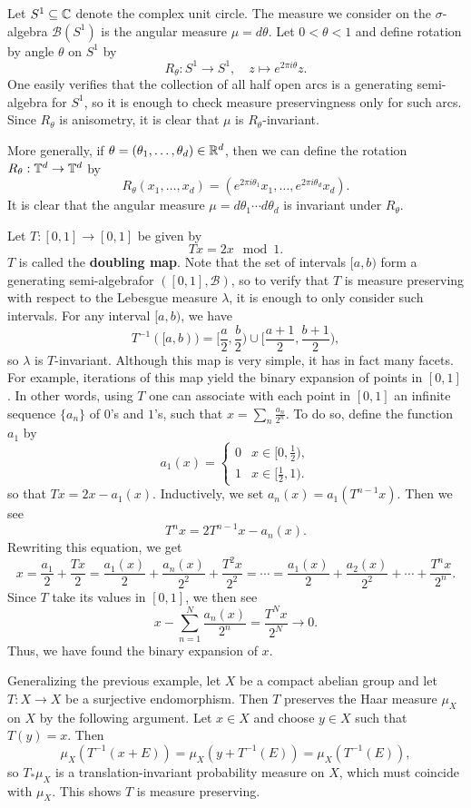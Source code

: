 \begin{example}
Let $S^1\subseteq\mathbb{C}$ denote the complex unit circle. The measure we consider on the $\sigma$-algebra $\mathcal{B}(S^1)$ is the angular measure $\mu=d\theta$. Let $0<\theta<1$ and define rotation by angle $\theta$ on $S^1$ by
\[R_\theta:S^1\to S^1,\quad z\mapsto e^{2\pi i\theta}z.\]
One easily verifies that the collection of all half open arcs is a generating semi-algebra for $S^1$, so it is enough to check measure preservingness only for such arcs. Since $R_\theta$ is anisometry, it is clear that $\mu$ is $R_\theta$-invariant.\par
More generally, if $\theta=(\theta_1,\dots,\theta_d)\in\mathbb{R}^d$, then we can define the rotation $R_\theta:\mathbb{T}^d\to\mathbb{T}^d$ by
\[R_\theta(x_1,\dots,x_d)=(e^{2\pi i\theta_1}x_1,\dots,e^{2\pi i\theta_d}x_d).\]
It is clear that the angular measure $\mu=d\theta_1\cdots d\theta_d$ is invariant under $R_\theta$.
\end{example}
\begin{example}
Let $T:[0,1]\to[0,1]$ be given by
\[Tx=2x\mod 1.\]
$T$ is called the \textbf{doubling map}. Note that the set of intervals $[a,b)$ form a generating semi-algebrafor $([0,1],\mathcal{B})$, so to verify that $T$ is measure preserving with respect to the Lebesgue measure $\lambda$, it is enough to only consider such intervals. For any interval $[a,b)$, we have
\[T^{-1}([a,b))=[\frac{a}{2},\frac{b}{2})\cup[\frac{a+1}{2},\frac{b+1}{2}),\]
so $\lambda$ is $T$-invariant. Although this map is very simple, it has in fact many facets. For example, iterations of this map yield the binary expansion of points in $[0,1]$. In other words, using $T$ one can associate with each point in $[0,1]$ an infinite sequence $\{a_n\}$ of $0$'s and $1$'s, such that $x=\sum_{n}\frac{a_n}{2^n}$. To do so, define the function $a_1$ by
\[a_1(x)=\begin{cases}
0&x\in[0,\frac{1}{2}),\\
1&x\in[\frac{1}{2},1).
\end{cases}\]
so that $Tx=2x-a_1(x)$. Inductively, we set $a_n(x)=a_1(T^{n-1}x)$. Then we see
\[T^nx=2T^{n-1}x-a_n(x).\]
Rewriting this equation, we get
\[x=\frac{a_1}{2}+\frac{Tx}{2}=\frac{a_1(x)}{2}+\frac{a_n(x)}{2^2}+\frac{T^2x}{2^2}=\cdots=\frac{a_1(x)}{2}+\frac{a_2(x)}{2^2}+\cdots+\frac{T^nx}{2^n}.\]
Since $T$ take its values in $[0,1]$, we then see
\[x-\sum_{n=1}^{N}\frac{a_n(x)}{2^n}=\frac{T^Nx}{2^N}\to 0.\]
Thus, we have found the binary expansion of $x$.
\end{example}
\begin{example}\label{measure preserving surjective homo eg}
Generalizing the previous example, let $X$ be a compact abelian group and let $T:X\to X$ be a surjective endomorphism. Then $T$ preserves the Haar measure $\mu_X$ on $X$ by the following argument. Let $x\in X$ and choose $y\in X$ such that $T(y)=x$. Then
\[\mu_X(T^{-1}(x+E))=\mu_X(y+T^{-1}(E))=\mu_X(T^{-1}(E)),\]
so $T_*\mu_X$ is a translation-invariant probability measure on $X$, which must coincide with $\mu_X$. This shows $T$ is measure preserving.
\end{example}
